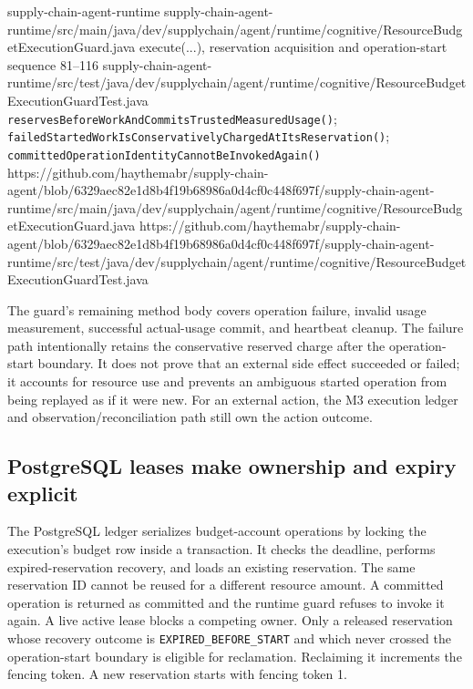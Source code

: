   {supply-chain-agent-runtime}
  {supply-chain-agent-runtime/src/main/java/dev/supplychain/agent/runtime/cognitive/ResourceBudgetExecutionGuard.java}
  {execute(...), reservation acquisition and operation-start sequence}
  {81--116}
  {supply-chain-agent-runtime/src/test/java/dev/supplychain/agent/runtime/cognitive/ResourceBudgetExecutionGuardTest.java}
  {\texttt{reservesBeforeWorkAndCommitsTrustedMeasuredUsage()}; \texttt{failedStartedWorkIsConservativelyChargedAtItsReservation()}; \texttt{committedOperationIdentityCannotBeInvokedAgain()}}
  {https://github.com/haythemabr/supply-chain-agent/blob/6329aec82e1d8b4f19b68986a0d4cf0c448f697f/supply-chain-agent-runtime/src/main/java/dev/supplychain/agent/runtime/cognitive/ResourceBudgetExecutionGuard.java}
  {https://github.com/haythemabr/supply-chain-agent/blob/6329aec82e1d8b4f19b68986a0d4cf0c448f697f/supply-chain-agent-runtime/src/test/java/dev/supplychain/agent/runtime/cognitive/ResourceBudgetExecutionGuardTest.java}

The guard's remaining method body covers operation failure, invalid usage measurement, successful actual-usage commit, and heartbeat cleanup. The failure path intentionally retains the conservative reserved charge after the operation-start boundary. It does not prove that an external side effect succeeded or failed; it accounts for resource use and prevents an ambiguous started operation from being replayed as if it were new. For an external action, the M3 execution ledger and observation/reconciliation path still own the action outcome.

\subsection{PostgreSQL leases make ownership and expiry explicit}
\label{subsec:ch23-postgres-resource-lease}

The PostgreSQL ledger serializes budget-account operations by locking the execution's budget row inside a transaction. It checks the deadline, performs expired-reservation recovery, and loads an existing reservation. The same reservation ID cannot be reused for a different resource amount. A committed operation is returned as committed and the runtime guard refuses to invoke it again. A live active lease blocks a competing owner. Only a released reservation whose recovery outcome is \texttt{EXPIRED\_BEFORE\_START} and which never crossed the operation-start boundary is eligible for reclamation. Reclaiming it increments the fencing token. A new reservation starts with fencing token 1.

